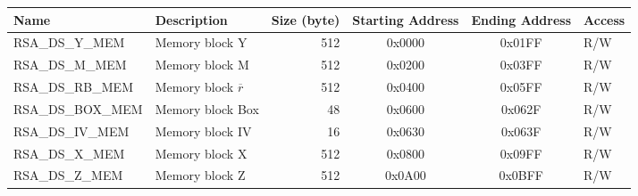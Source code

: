 \begin{longtable}{ | l | l | r | c | c | l | }
\hline
\rowcolor{lightgray}
\textbf{Name} & \textbf{Description}  &  \textbf{Size (byte)}  &  \textbf{Starting Address}  &  \textbf{Ending Address}  & \textbf{Access}   \\ \hline
RSA\_DS\_Y\_MEM\label{RSADSYMEM} & Memory block Y  & 512  & 0x0000 & 0x01FF & R/W \\ \hline
RSA\_DS\_M\_MEM\label{RSADSMMEM} & Memory block M & 512  & 0x0200 & 0x03FF & R/W \\ \hline
RSA\_DS\_RB\_MEM\label{RSADSRBMEM} & Memory block $\overline{r}$  & 512  & 0x0400 & 0x05FF & R/W \\ \hline
RSA\_DS\_BOX\_MEM\label{RSADSBOXMEM} & Memory block Box  & 48  & 0x0600 & 0x062F & R/W \\ \hline
RSA\_DS\_IV\_MEM\label{RSADSIVMEM} & Memory block IV  & 16  & 0x0630 & 0x063F & R/W \\ \hline
RSA\_DS\_X\_MEM\label{RSADSXMEM} & Memory block X  & 512  & 0x0800 & 0x09FF & R/W \\ \hline
RSA\_DS\_Z\_MEM\label{RSADSZMEM} & Memory block Z  & 512  & 0x0A00 & 0x0BFF & R/W \\ \hline
\end{longtable}
